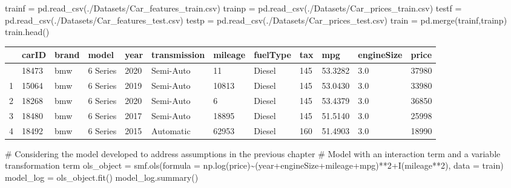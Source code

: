 \documentclass[
  letterpaper,
  DIV=11,
  numbers=noendperiod]{scrreprt}
\newenvironment{Shaded}{\begin{snugshade}}{\end{snugshade}}
\newcommand{\CommentTok}[1]{\textcolor[rgb]{0.37,0.37,0.37}{#1}}
\newcommand{\NormalTok}[1]{\textcolor[rgb]{0.00,0.23,0.31}{#1}}
\newcommand{\OperatorTok}[1]{\textcolor[rgb]{0.37,0.37,0.37}{#1}}
\newcommand{\StringTok}[1]{\textcolor[rgb]{0.13,0.47,0.30}{#1}}
\begin{document}
\begin{Shaded}
\begin{Highlighting}[]
\NormalTok{trainf }\OperatorTok{=}\NormalTok{ pd.read\_csv(}\StringTok{\textquotesingle{}./Datasets/Car\_features\_train.csv\textquotesingle{}}\NormalTok{)}
\NormalTok{trainp }\OperatorTok{=}\NormalTok{ pd.read\_csv(}\StringTok{\textquotesingle{}./Datasets/Car\_prices\_train.csv\textquotesingle{}}\NormalTok{)}
\NormalTok{testf }\OperatorTok{=}\NormalTok{ pd.read\_csv(}\StringTok{\textquotesingle{}./Datasets/Car\_features\_test.csv\textquotesingle{}}\NormalTok{)}
\NormalTok{testp }\OperatorTok{=}\NormalTok{ pd.read\_csv(}\StringTok{\textquotesingle{}./Datasets/Car\_prices\_test.csv\textquotesingle{}}\NormalTok{)}
\NormalTok{train }\OperatorTok{=}\NormalTok{ pd.merge(trainf,trainp)}
\NormalTok{train.head()}
\end{Highlighting}
\end{Shaded}

\begin{longtable}[]{@{}llllllllllll@{}}
\toprule\noalign{}
& carID & brand & model & year & transmission & mileage & fuelType & tax
& mpg & engineSize & price \\
\midrule\noalign{}
\endhead
\bottomrule\noalign{}
\endlastfoot
0 & 18473 & bmw & 6 Series & 2020 & Semi-Auto & 11 & Diesel & 145 &
53.3282 & 3.0 & 37980 \\
1 & 15064 & bmw & 6 Series & 2019 & Semi-Auto & 10813 & Diesel & 145 &
53.0430 & 3.0 & 33980 \\
2 & 18268 & bmw & 6 Series & 2020 & Semi-Auto & 6 & Diesel & 145 &
53.4379 & 3.0 & 36850 \\
3 & 18480 & bmw & 6 Series & 2017 & Semi-Auto & 18895 & Diesel & 145 &
51.5140 & 3.0 & 25998 \\
4 & 18492 & bmw & 6 Series & 2015 & Automatic & 62953 & Diesel & 160 &
51.4903 & 3.0 & 18990 \\
\end{longtable}

\begin{Shaded}
\begin{Highlighting}[]
\CommentTok{\# Considering the model developed to address assumptions in the previous chapter}
\CommentTok{\# Model with an interaction term and a variable transformation term}
\NormalTok{ols\_object }\OperatorTok{=}\NormalTok{ smf.ols(formula }\OperatorTok{=} \StringTok{\textquotesingle{}np.log(price)\textasciitilde{}(year+engineSize+mileage+mpg)**2+I(mileage**2)\textquotesingle{}}\NormalTok{, data }\OperatorTok{=}\NormalTok{ train)}
\NormalTok{model\_log }\OperatorTok{=}\NormalTok{ ols\_object.fit()}
\NormalTok{model\_log.summary()}
\end{Highlighting}
\end{Shaded}
\end{document}
